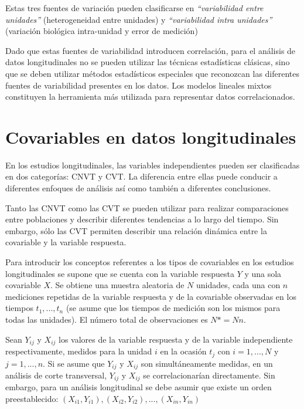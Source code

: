 \documentclass[spanish]{article}
\numberwithin{figure}{subsection}
\numberwithin{equation}{subsection}
\numberwithin{table}{subsection}
\begin{document}
Estas tres fuentes de variación pueden clasificarse en \textit{``variabilidad
entre unidades''} (heterogeneidad entre unidades) y \textit{``variabilidad
intra unidades''} (variación biológica intra-unidad y error de medición)

Dado que estas fuentes de variabilidad introducen correlación, para el análisis
de datos longitudinales no se pueden utilizar las técnicas estadísticas
clásicas, sino que se deben utilizar métodos estadísticos especiales que
reconozcan las diferentes fuentes de variabilidad presentes en los datos. Los
modelos lineales mixtos constituyen la herramienta más utilizada para
representar datos correlacionados.

\section{Covariables en datos longitudinales}

En los estudios longitudinales, las variables independientes pueden ser
clasificadas en dos categorías: CNVT y CVT. La diferencia entre
ellas puede conducir a diferentes enfoques de análisis así como también a
diferentes conclusiones.

Tanto las CNVT como las CVT se pueden utilizar para realizar comparaciones entre
poblaciones y describir diferentes tendencias a lo largo del tiempo. Sin
embargo, sólo las CVT permiten describir una relación dinámica entre la
covariable y la variable respuesta.

Para introducir los conceptos referentes a los tipos de covariables en los
estudios longitudinales se supone que se cuenta con la variable respuesta $Y$ y
una sola covariable $X$. Se obtiene una muestra aleatoria de $N$ unidades, cada
una con $n$ mediciones repetidas de la variable respuesta y de la covariable
observadas en los tiempos $t_1, ..., t_n$ (se asume que los tiempos de medición
son los mismos para todas las unidades). El número total de observaciones es
$N*=Nn$.

Sean $Y_{ij}$ y $X_{ij}$ los valores de la variable respuesta y de la variable
independiente respectivamente, medidos para la unidad $i$ en la ocasión $t_j$
con $i = 1, ..., N$ y $j = 1, ..., n$. Si se asume que $Y_{ij}$ y $X_{ij}$ son
simultáneamente medidas, en un análisis de corte transversal, $Y_{ij}$ y
$X_{ij}$ se correlacionarían directamente. Sin embargo, para un análisis
longitudinal se debe asumir que existe un orden preestablecido:
$(X_{i1}, Y_{i1}), (X_{i2}, Y_{i2}), ..., (X_{in}, Y_{in})$
\end{document}
